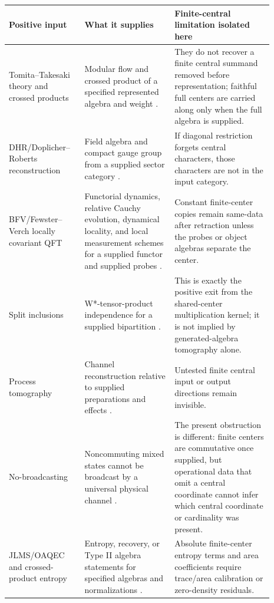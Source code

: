 \documentclass[12pt]{article}
\theoremstyle{definition}
\theoremstyle{remark}
\begin{document}
\begin{longtable}{p{0.24\linewidth}p{0.31\linewidth}p{0.34\linewidth}}
\toprule
Positive input & What it supplies & Finite-central limitation isolated here \\
\midrule
Tomita--Takesaki theory and crossed products & Modular flow and crossed
product of a specified represented algebra and weight
\cite{TakesakiI,TakesakiII,TakesakiDuality,WittenCrossed}. & They do not
recover a finite central summand removed before representation; faithful full
centers are carried along only when the full algebra is supplied. \\
DHR/Doplicher--Roberts reconstruction & Field algebra and compact gauge group
from a supplied sector category \cite{DHR1,DHR2,DRDuality,DR}. & If diagonal
restriction forgets central characters, those characters are not in the input
category. \\
BFV/Fewster--Verch locally covariant QFT & Functorial dynamics, relative
Cauchy evolution, dynamical locality, and local measurement schemes for a
supplied functor and supplied probes
\cite{BFV,FewsterVerch,FewsterVerchMeasurements}. & Constant finite-center
copies remain same-data after retraction unless the probes or object algebras
separate the center. \\
Split inclusions & W*-tensor-product independence for a supplied bipartition
\cite{DoplicherLongoSplit,BuchholzWichmann,WernerSplit}. & This is exactly the
positive exit from the shared-center multiplication kernel; it is not implied
by generated-algebra tomography alone. \\
Process tomography & Channel reconstruction relative to supplied
preparations and effects \cite{Jamiolkowski,Choi,ChuangNielsenProcess}. &
Untested finite central input or output directions remain invisible. \\
No-broadcasting & Noncommuting mixed states cannot be broadcast by a universal
physical channel \cite{NoBroadcasting}. & The present obstruction is different:
finite centers are commutative once supplied, but operational data that omit a
central coordinate cannot infer which central coordinate or cardinality was
present. \\
JLMS/OAQEC and crossed-product entropy & Entropy, recovery, or Type II
algebra statements for specified algebras and normalizations
\cite{Petz,JLMS,HarlowRT,DHW,WittenCrossed,LongoWitten,CLPW,CPW}. & Absolute
finite-center entropy terms and area coefficients require trace/area
calibration or zero-density residuals. \\
\bottomrule
\end{longtable}
\end{document}
